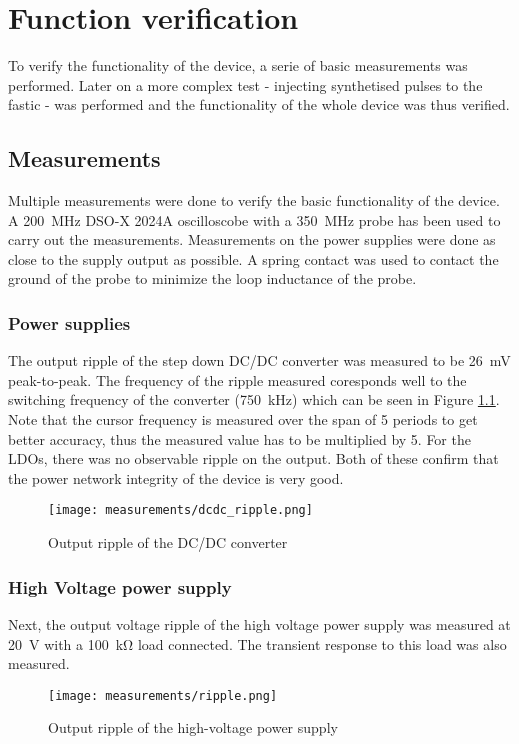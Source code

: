 \chapter{Function verification}
To verify the functionality of the device, a serie of basic measurements was performed. Later on a more complex test - injecting synthetised pulses to the fastic - was performed and the functionality of the whole device was thus verified.
\section{Measurements}
Multiple measurements were done to verify the basic functionality of the device. A \SI{200}{\mega\hertz} DSO-X 2024A oscilloscobe with a \SI{350}{\mega\hertz} probe has been used to carry out the measurements. Measurements on the power supplies were done as close to the supply output as possible. A spring contact was used to contact the ground of the probe to minimize the loop inductance of the probe.
\subsection{Power supplies}
The output ripple of the step down DC/DC converter was measured to be \SI{26}{\milli\volt} peak-to-peak. The frequency of the ripple measured coresponds well to the switching frequency of the converter (\SI{750}{\kilo\hertz}) \cite{diodes_ap62201} which can be seen in Figure \ref{fig:dcdc_ripple}. Note that the cursor frequency is measured over the span of 5 periods to get better accuracy, thus the measured value has to be multiplied by 5. For the LDOs, there was no observable ripple on the output. Both of these confirm that the power network integrity of the device is very good.

\FloatBarrier
\begin{figure}[!htpb]
    \begin{center}
        \texttt{[image: measurements/dcdc\_ripple.png]}
        \caption{Output ripple of the DC/DC converter}
        \label{fig:dcdc_ripple}
    \end{center}
\end{figure}
\FloatBarrier

\subsection{High Voltage power supply}
Next, the output voltage ripple of the high voltage power supply was measured at \SI{20}{\volt} with a \SI{100}{\kilo\ohm} load connected. The transient response to this load was also measured. 
\FloatBarrier
\begin{figure}[!htpb]
    \begin{center}
        \texttt{[image: measurements/ripple.png]}
        \caption{Output ripple of the high-voltage power supply}
        \label{fig:hv_ripple}
    \end{center}
\end{figure}
\FloatBarrier


